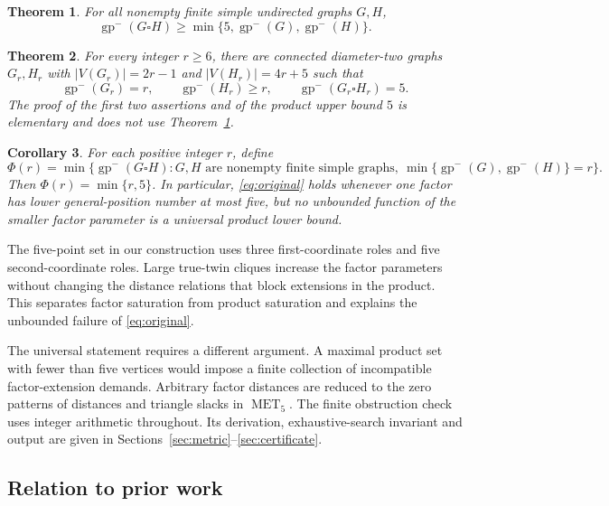 \documentclass[11pt]{article}
\newtheorem{theorem}{Theorem}[section]
\newtheorem{corollary}[theorem]{Corollary}
\theoremstyle{definition}
\theoremstyle{remark}
\newcommand{\lgp}{\operatorname{gp}^{-}}
\newcommand{\MET}{\operatorname{MET}}
\newcommand{\card}[1]{\lvert #1\rvert}
\begin{document}
\begin{theorem}\label{thm:universal}
For all nonempty finite simple undirected graphs $G,H$,
\begin{equation}\label{eq:five}
 \lgp(G\square H)\geq\min\{5,\lgp(G),\lgp(H)\}.
\end{equation}
\end{theorem}

\begin{theorem}\label{thm:family}
For every integer $r\geq6$, there are connected diameter-two graphs $G_r,H_r$
with $\card{V(G_r)}=2r-1$ and $\card{V(H_r)}=4r+5$ such that
\[
 \lgp(G_r)=r,\qquad \lgp(H_r)\geq r,\qquad
 \lgp(G_r\square H_r)=5.
\]
The proof of the first two assertions and of the product upper bound $5$ is
elementary and does not use Theorem~\ref{thm:universal}.
\end{theorem}

\begin{corollary}\label{cor:optimal}
For each positive integer $r$, define
\[
 \Phi(r)=\min\bigl\{\lgp(G\square H): G,H\text{ are nonempty finite simple graphs},
 \ \min\{\lgp(G),\lgp(H)\}=r\bigr\}.
\]
Then $\Phi(r)=\min\{r,5\}$. In particular, \eqref{eq:original} holds whenever
one factor has lower general-position number at most five, but no unbounded
function of the smaller factor parameter is a universal product lower bound.
\end{corollary}

The five-point set in our construction uses three first-coordinate roles and
five second-coordinate roles. Large true-twin cliques increase the factor
parameters without changing the distance relations that block extensions in
the product. This separates factor saturation from product saturation and
explains the unbounded failure of \eqref{eq:original}.

The universal statement requires a different argument. A maximal product set
with fewer than five vertices would impose a finite collection of incompatible
factor-extension demands. Arbitrary factor distances are reduced to the zero
patterns of distances and triangle slacks in $\MET_5$. The finite obstruction
check uses integer arithmetic throughout. Its derivation, exhaustive-search
invariant and output are given in Sections~\ref{sec:metric}--\ref{sec:certificate}.

\subsection*{Relation to prior work}
\end{document}
